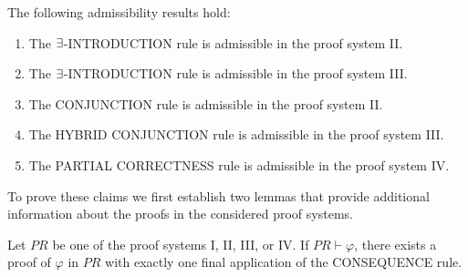 \documentclass[manuscript, screen, review]{acmart}
\begin{document}
\begin{lemma}[Admissibility] \label{lem:admissibility}
The following admissibility results hold:


 \begin{enumerate} [$(i)$] 
    
   \item The $\mbox{$\exists$}$-{\rm INTRODUCTION} rule is admissible in the proof system {\rm II}. 
   
    \vspace{2mm}
        
   \item The $\mbox{$\exists$}$-{\rm INTRODUCTION} rule is admissible in the proof system {\rm III}.
   
    \vspace{2mm}
  
   \item The {\rm CONJUNCTION} rule is admissible in the proof system {\rm II}.
   
    \vspace{2mm}

   \item The {\rm HYBRID CONJUNCTION} rule is admissible in the proof system {\rm III}.
         
    \vspace{2mm}
         
   \item The {\rm PARTIAL CORRECTNESS} rule is admissible in the proof system {\rm IV}.
   
   

 \end{enumerate}

\end{lemma}

To prove these claims we first establish two lemmas that provide additional
information about the proofs in the considered proof systems.

\begin{lemma} \label{lemma:1}
Let $\mathit{PR}$ be one of the proof systems I, II, III, or IV.
If $\mathit{PR} \vdash \varphi$, there exists a proof of $\varphi$ in $\mathit{PR}$ 
with exactly one final application of the CONSEQUENCE rule.
\end{lemma}
\end{document}
